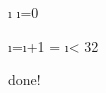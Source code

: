 
\newcount\i
\i=0

\newcount\x
{}

\loop
	\i=\numexpr\i+1\relax
	\x=\numexpr{}\relax
	\edef\t{\the\x}
	\show\t
\ifnum \i < 32 \repeat



done!

\bye
